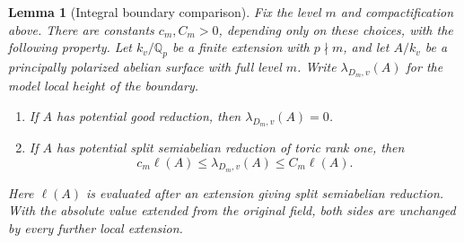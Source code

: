 \documentclass[11pt,a4paper]{article}
\numberwithin{equation}{section}
\newtheorem{lemma}[theorem]{Lemma}
\theoremstyle{definition}
\theoremstyle{remark}
\newcommand{\Q}{\mathbb Q}
\begin{document}
\begin{lemma}[Integral boundary comparison]\label{lem:boundary-comparison}
Fix the level \(m\) and compactification above. There are constants
\(c_m,C_m>0\), depending only on these choices, with the following
property. Let \(k_v/\Q_p\) be a finite extension with \(p\nmid m\),
and let \(A/k_v\) be a principally polarized abelian surface with
full level \(m\).
Write \(\lambda_{D_m,v}(A)\) for the model local height of the boundary.
\begin{enumerate}[label=(\roman*)]
\item If \(A\) has potential good reduction, then
\(\lambda_{D_m,v}(A)=0\).
\item If \(A\) has potential split semiabelian reduction of toric
rank one, then
\[
 c_m\ell(A)\le\lambda_{D_m,v}(A)\le C_m\ell(A).
\]
\end{enumerate}
Here \(\ell(A)\) is evaluated after an extension giving split
semiabelian reduction. With the absolute value extended from the
original field, both sides are unchanged by every further local
extension.
\end{lemma}
\end{document}
